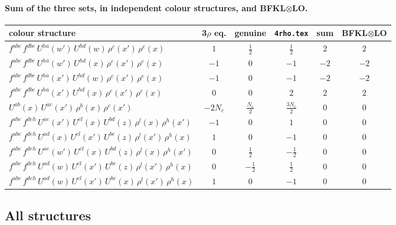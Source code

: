 \documentclass[10pt]{article}
\numberwithin{equation}{section}
\begin{document}
\paragraph{Sum of the three sets, in independent colour structures, and BFKL$\otimes$LO.}
\begin{center}\small\begin{tabular}{@{}l c c c c c@{}}
colour structure & 3$\rho$ eq. & genuine & \texttt{4rho.tex} & sum & BFKL$\otimes$LO\\ \hline
$f^{abc}\,f^{dbe}\,U^{ha}(w')\,U^{hd}(w)\,\rho^{c}(x')\,\rho^{e}(x)$ & $1$ & $\tfrac12$ & $\tfrac12$ & $2$ & $2$\\
$f^{abc}\,f^{dbe}\,U^{ha}(w')\,U^{hd}(x)\,\rho^{c}(x')\,\rho^{e}(x)$ & $-1$ & $0$ & $-1$ & $-2$ & $-2$\\
$f^{abc}\,f^{dbe}\,U^{ha}(x')\,U^{hd}(w)\,\rho^{c}(x')\,\rho^{e}(x)$ & $-1$ & $0$ & $-1$ & $-2$ & $-2$\\
$f^{abc}\,f^{dbe}\,U^{ha}(x')\,U^{hd}(x)\,\rho^{c}(x')\,\rho^{e}(x)$ & $0$ & $0$ & $2$ & $2$ & $2$\\
$U^{ab}(x)\,U^{ac}(x')\,\rho^{b}(x)\,\rho^{c}(x')$ & $- 2 N_c$ & $\tfrac{N_c}{2}$ & $\tfrac{3N_c}{2}$ & $0$ & $0$\\
$f^{abc}\,f^{deh}\,U^{ae}(x')\,U^{cl}(x)\,U^{bd}(z)\,\rho^{l}(x)\,\rho^{h}(x')$ & $-1$ & $0$ & $1$ & $0$ & $0$\\
$f^{abc}\,f^{deh}\,U^{ad}(x)\,U^{cl}(x')\,U^{be}(z)\,\rho^{l}(x')\,\rho^{h}(x)$ & $1$ & $0$ & $-1$ & $0$ & $0$\\
$f^{abc}\,f^{deh}\,U^{ae}(w')\,U^{cl}(x)\,U^{bd}(z)\,\rho^{l}(x)\,\rho^{h}(x')$ & $0$ & $\tfrac12$ & $- \tfrac12$ & $0$ & $0$\\
$f^{abc}\,f^{deh}\,U^{ad}(w)\,U^{cl}(x')\,U^{be}(z)\,\rho^{l}(x')\,\rho^{h}(x)$ & $0$ & $- \tfrac12$ & $\tfrac12$ & $0$ & $0$\\
$f^{abc}\,f^{deh}\,U^{ad}(w)\,U^{cl}(x')\,U^{be}(x)\,\rho^{l}(x')\,\rho^{h}(x)$ & $1$ & $0$ & $-1$ & $0$ & $0$\\
\end{tabular}\end{center}

\subsection{All structures}
\end{document}
